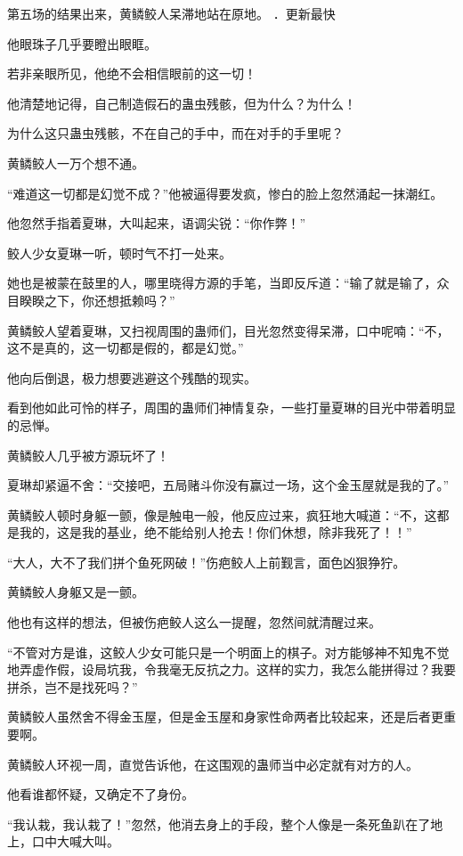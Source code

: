 
\begin{this_body}

第五场的结果出来，黄鳞鲛人呆滞地站在原地。 ．更新最快

他眼珠子几乎要瞪出眼眶。

若非亲眼所见，他绝不会相信眼前的这一切！

他清楚地记得，自己制造假石的蛊虫残骸，但为什么？为什么！

为什么这只蛊虫残骸，不在自己的手中，而在对手的手里呢？

黄鳞鲛人一万个想不通。

“难道这一切都是幻觉不成？”他被逼得要发疯，惨白的脸上忽然涌起一抹潮红。

他忽然手指着夏琳，大叫起来，语调尖锐：“你作弊！”

鲛人少女夏琳一听，顿时气不打一处来。

她也是被蒙在鼓里的人，哪里晓得方源的手笔，当即反斥道：“输了就是输了，众目睽睽之下，你还想抵赖吗？”

黄鳞鲛人望着夏琳，又扫视周围的蛊师们，目光忽然变得呆滞，口中呢喃：“不，这不是真的，这一切都是假的，都是幻觉。”

他向后倒退，极力想要逃避这个残酷的现实。

看到他如此可怜的样子，周围的蛊师们神情复杂，一些打量夏琳的目光中带着明显的忌惮。

黄鳞鲛人几乎被方源玩坏了！

夏琳却紧逼不舍：“交接吧，五局赌斗你没有赢过一场，这个金玉屋就是我的了。”

黄鳞鲛人顿时身躯一颤，像是触电一般，他反应过来，疯狂地大喊道：“不，这都是我的，这是我的基业，绝不能给别人抢去！你们休想，除非我死了！！”

“大人，大不了我们拼个鱼死网破！”伤疤鲛人上前觐言，面色凶狠狰狞。

黄鳞鲛人身躯又是一颤。

他也有这样的想法，但被伤疤鲛人这么一提醒，忽然间就清醒过来。

“不管对方是谁，这鲛人少女可能只是一个明面上的棋子。对方能够神不知鬼不觉地弄虚作假，设局坑我，令我毫无反抗之力。这样的实力，我怎么能拼得过？我要拼杀，岂不是找死吗？”

黄鳞鲛人虽然舍不得金玉屋，但是金玉屋和身家性命两者比较起来，还是后者更重要啊。

黄鳞鲛人环视一周，直觉告诉他，在这围观的蛊师当中必定就有对方的人。

他看谁都怀疑，又确定不了身份。

“我认栽，我认栽了！”忽然，他消去身上的手段，整个人像是一条死鱼趴在了地上，口中大喊大叫。


\end{this_body}
